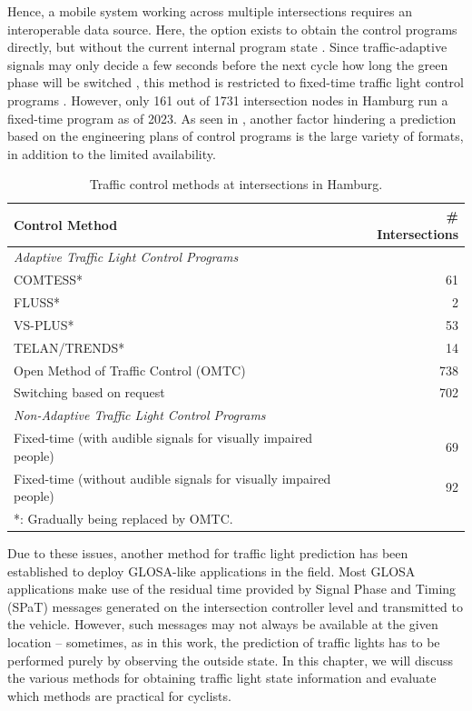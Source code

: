 Hence, a mobile system working across multiple intersections requires an interoperable data source. Here, the option exists to obtain the control programs directly, but without the current internal program state \cite{zweck_traffic_2013}. Since traffic-adaptive signals may only decide a few seconds before the next cycle how long the green phase will be switched \cite{islam_improved_2016}, this method is restricted to fixed-time traffic light control programs \cite{zweck_traffic_2013}. However, only 161 out of 1731 intersection nodes in Hamburg run a fixed-time program as of 2023. As seen in , another factor hindering a prediction based on the engineering plans of control programs is the large variety of formats, in addition to the limited availability.

\begin{table}[htbp]
    \centering
    \begin{tabular}{lr}
        \hline
        \textbf{Control Method} & \textbf{\# Intersections} \\
        \hline
        \multicolumn{2}{l}{\textit{Adaptive Traffic Light Control Programs}} \\
        COMTESS* & 61 \\
        FLUSS* & 2 \\
        VS-PLUS* & 53 \\
        TELAN/TRENDS* & 14 \\
        Open Method of Traffic Control (OMTC) & 738  \\
        Switching based on request & 702 \\
        \hline
        \multicolumn{2}{l}{\textit{Non-Adaptive Traffic Light Control Programs}} \\
        Fixed-time (with audible signals for visually impaired people) & 69 \\
        Fixed-time (without audible signals for visually impaired people) & 92 \\
        \hline
        \multicolumn{2}{l}{\footnotesize{*: Gradually being replaced by OMTC.}}
    \end{tabular}
    \caption{Traffic control methods at intersections in Hamburg\footnotemark{}.}
    \label{tab:control-programs}
\end{table}

Due to these issues, another method for traffic light prediction has been established to deploy GLOSA-like applications in the field. Most GLOSA applications make use of the residual time provided by Signal Phase and Timing (SPaT) messages generated on the intersection controller level and transmitted to the vehicle. However, such messages may not always be available at the given location -- sometimes, as in this work, the prediction of traffic lights has to be performed purely by observing the outside state. In this chapter, we will discuss the various methods for obtaining traffic light state information and evaluate which methods are practical for cyclists.

